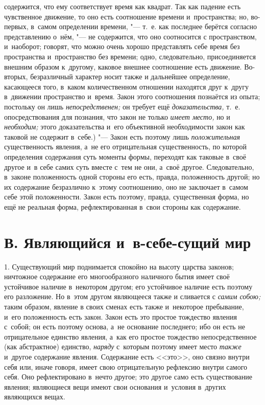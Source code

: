 содержится, что ему соответствует время как квадрат. Так как падение есть
чувственное движение, то оно есть соотношение времени и~пространства; но,
во-первых, в~самом определении времени, "--- т.~е. как последнее берётся
согласно представлению о~нём, "--- не содержится, что оно соотносится с
пространством, и~наоборот; говорят, что можно очень хорошо представлять
себе время без пространства и~пространство без времени; одно,
следовательно, присоединяется внешним образом к~другому, каковое внешнее
соотношение есть движение. Во-вторых, безразличный характер носит также и
дальнейшее определение, касающееся того, в~каком количественном отношении
находятся друг к~другу в~движении пространство и~время. Закон этого
соотношения познаётся из опыта; постольку он лишь
{\em непосредственен;} он требует ещё
{\em доказательства,} т.~е. опосредствования для
познания, что закон не только {\em имеет место,} но и
{\em необходим;} этого доказательства и~его объективной
необходимости закон как таковой не содержит в~себе.) "--- Закон есть поэтому
лишь {\em положительная} существенность явления, а~не
его отрицательная существенность, по которой определения содержания суть
моменты формы, переходят как таковые в~своё другое и~в себе самих суть
вместе с~тем не они, а~своё другое. Следовательно, в~законе положенность
одной стороны его есть, правда, положенность другой; но их содержание
безразлично к~этому соотношению, оно не заключает в~самом себе этой
положенности. Закон есть поэтому, правда, существенная форма, но ещё не
реальная форма, рефлектированная в~свои стороны как содержание.


\section[В. Являющийся и~в-себе-сущий мир]{В. Являющийся и~в-себе-сущий мир}

1. Существующий мир поднимается спокойно на
высоту царства законов; ничтожное содержание его многообразного наличного
бытия имеет своё устойчивое наличие в~некотором другом; его устойчивое
наличие есть поэтому его разложение. Но в~этом другом являющееся также и
сливается с {\em самим собою;} таким образом, явление в
своих сменах есть также и~некоторое пребывание, и~его положенность есть
закон. Закон есть это простое тождество явления с~собой; он есть поэтому
основа, а~не основание последнего; ибо он есть не отрицательное единство
явления, а~как его простое тождество непосредственное (как абстрактное)
единство, {\em наряду} с~которым поэтому имеет место
{\em также} и~другое содержание явления. Содержание
есть <<это>>, оно связно внутри себя или, иначе говоря, имеет свою
отрицательную рефлексию внутри самого себя. Оно рефлектировано в~нечто
другое; это другое само есть существование явления; являющиеся вещи имеют
свои основания и~условия в~других являющихся вещах.

